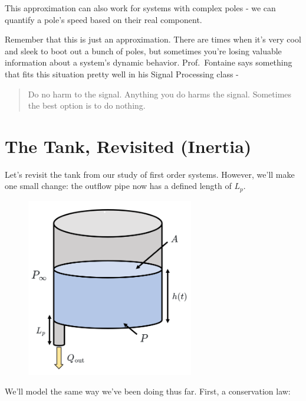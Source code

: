 \documentclass[
  letterpaper,
  DIV=11,
  numbers=noendperiod]{scrreprt}
\begin{document}
This approximation can also work for systems with complex poles - we can
quantify a pole's speed based on their real component.

Remember that this is just an approximation. There are times when it's
very cool and sleek to boot out a bunch of poles, but sometimes you're
losing valuable information about a system's dynamic behavior.
Prof.~Fontaine says something that fits this situation pretty well in
his Signal Processing class -

\begin{quote}
Do no harm to the signal. Anything you do harms the signal. Sometimes
the best option is to do nothing.
\end{quote}

\hypertarget{the-tank-revisited-inertia}{%
\section{The Tank, Revisited
(Inertia)}\label{the-tank-revisited-inertia}}

Let's revisit the tank from our study of first order systems. However,
we'll make one small change: the outflow pipe now has a defined length
of \(L_p\).

\begin{figure}

{\centering \includegraphics[width=0.65\textwidth,height=\textheight]{figs/3_tank3.png}

}

\end{figure}

We'll model the same way we've been doing thus far. First, a
conservation law:
\end{document}
